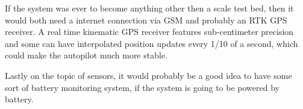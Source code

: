 If the system was ever to become anything other then a scale test bed, then it would both need a internet connection via GSM and probably an RTK GPS receiver. A real time kinematic GPS receiver features sub-centimeter precision and some can have interpolated position updates every 1/10 of a second, which could make the autopilot much more stable.

Lastly on the topic of sensors, it would probably be a good idea to have some sort of battery monitoring system, if the system is going to be powered by battery. 

